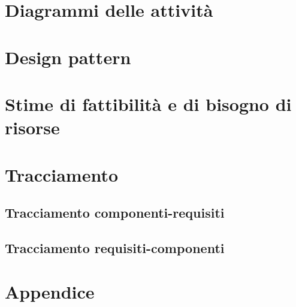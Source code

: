 \documentclass[a4paper]{article}
\begin{document}
	\section{Diagrammi delle attività}
	
	\newpage 
	\section{Design pattern}
	
	\newpage 
	\section{Stime di fattibilità e di bisogno di risorse}
	
	\newpage 
	\section{Tracciamento}
		\subsection{Tracciamento componenti-requisiti}
		\subsection{Tracciamento requisiti-componenti}
		
	\newpage 
	\section{Appendice}
	
	\cleardoublepage
	\listoffigures
	
	\cleardoublepage
	\listoftables
		
\end{document}
